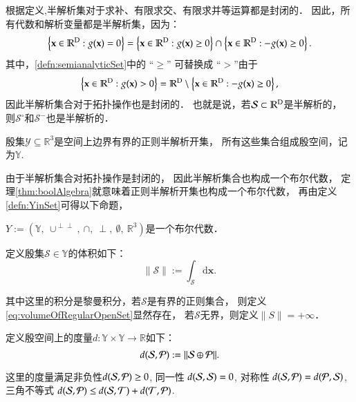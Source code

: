 	
根据定义,半解析集对于求补、有限求交、有限求并等运算都是封闭的．
因此，所有代数和解析变量都是半解析集，因为：
 \begin{equation*}
\left\{\mathbf{x}\in \mathbb{R}^{\textup{D}} : g(\mathbf{x})=0\right\} =
\left\{\mathbf{x}\in \mathbb{R}^{\textup{D}} : g(\mathbf{x})\ge 0\right\}
\cap
\left\{\mathbf{x}\in \mathbb{R}^{\textup{D}} : -g(\mathbf{x})\ge 0\right\}.
\end{equation*}
其中，\eqref{defn:semianalyticSet}中的 “$\ge$” 可替换成 ``$>$''由于
\begin{equation*}
\left\{\mathbf{x}\in \mathbb{R}^{\textup{D}} : g(\mathbf{x})> 0\right\} =
\mathbb{R}^{\textup{D}} \setminus
\left\{\mathbf{x}\in \mathbb{R}^{\textup{D}} : -g(\mathbf{x})\ge 0\right\},
\end{equation*}
因此半解析集合对于拓扑操作也是封闭的．
也就是说，若$\mathcal{S}\subset \mathbb{R}^{\textup{D}}$是半解析的，
则$\mathcal{S}^{\circ}$和$\mathcal{S}^-$也是半解析的．　
\begin{defn}
\label{defn:YinSet}
殷集$\mathcal{Y}\subseteq\mathbb{R}^3$是空间上边界有界的正则半解析开集，
所有这些集合组成殷空间，记为$\mathbb{Y}$.
\end{defn}
由于半解析集合对拓扑操作是封闭的，
因此半解析集合也构成一个布尔代数，
定理\ref{thm:boolAlgebra}就意味着正则半解析开集也构成一个布尔代数，
再由定义\ref{defn:YinSet}可得以下命题，
\begin{prop}
	$Y := ( \mathbb{Y},\   \cup^{\perp \perp},\   \cap,\   \perp,\   \emptyset,\   \mathbb{R}^3)$是一个布尔代数．
\end{prop}
\begin{defn}
定义殷集$\mathcal{S} \in \mathbb{Y}$的体积如下：
 \begin{equation}
\label{eq:volumeOfRegularOpenSet}
\|{\mathcal S}\| := \int_{{\mathcal S}}\mathrm{d} \mathbf{x}.
\end{equation}
\end{defn}
其中这里的积分是黎曼积分，若$\mathcal{S}$是有界的正则集合，
则定义\eqref{eq:volumeOfRegularOpenSet}显然存在，
若$\mathcal{S}$无界，则定义$\|S\|=+\infty$．
\begin{defn}
定义殷空间上的度量$d :\mathbb{Y}\times\mathbb{Y} \rightarrow \mathbb{R}$如下：
 \begin{equation}
\label{eq:MetricOfYinSpace}
d({\cal S},{\cal P}) := \|{\cal S}\oplus {\cal P}\|.
\end{equation}
\end{defn}
这里的度量满足非负性$d({\cal S},{\cal P})\ge 0$,
同一性 $d({\cal S},{\cal S})=0$,
对称性 $d({\cal S},{\cal P})= d({\cal P},{\cal S})$,
三角不等式 
$d({\cal S},{\cal P})\le d({\cal S},{\cal T}) + d({\cal T},{\cal P})$.






